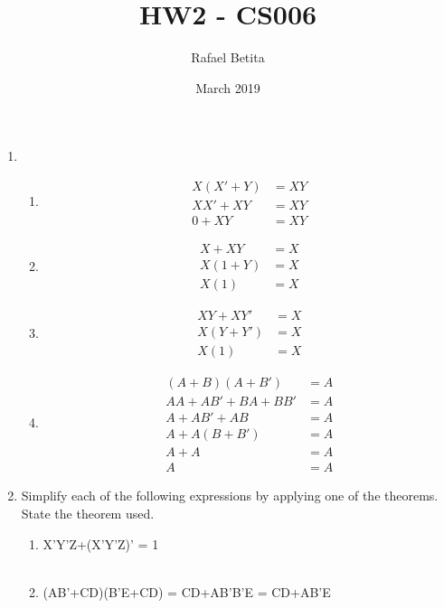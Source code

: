 \documentclass[12pt]{article}
\title{HW2 - CS006}
\author{Rafael Betita}
\date{March 2019}
\begin{document}
\maketitle

\newpage

\begin{enumerate}
    \item {}
    \begin{enumerate}
        \item 
            \begin{align*}
            X(X'+Y)&=XY\\
            XX'+XY&=XY\\
            0+XY&=XY
            \end{align*}
        \item
            \begin{align*}
                X+XY&=X\\
                X(1+Y)&=X\\
                X(1)&=X
            \end{align*}
        \item
            \begin{align*}
                XY+XY'&=X\\
                X(Y+Y')&=X\\
                X(1)&=X
            \end{align*}
        \item
            \begin{align*}
                (A+B)(A+B')&=A\\
                AA+AB'+BA+BB'&=A\\
                A+AB'+AB&=A\\
                A+A(B+B')&=A\\
                A+A&=A\\
                A&=A
            \end{align*}
    \end{enumerate}
    \newpage\addtocounter{enumi}{1}\item Simplify each of the following expressions by applying one of the theorems. State the theorem used.
        \begin{enumerate}
            \item X'Y'Z+(X'Y'Z)' = 1 
            \\\\
            \item (AB'+CD)(B'E+CD) = CD+AB'B'E = CD+AB'E

\end{enumerate}
\end{enumerate}
\end{document}
